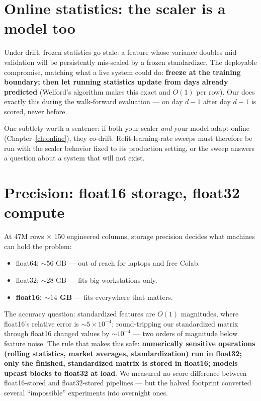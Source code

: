 \section{Online statistics: the scaler is a model too}

Under drift, frozen statistics go stale: a feature whose variance doubles
mid-validation will be persistently mis-scaled by a frozen standardizer.
The deployable compromise, matching what a live system could do:
\textbf{freeze at the training boundary; then let running statistics update
from days already predicted} (Welford's algorithm makes this exact and
$O(1)$ per row). Our  does exactly this during the
walk-forward evaluation ---  on day $d{-}1$ after day
$d{-}1$ is scored, never before.

One subtlety worth a sentence: if both your scaler \emph{and} your model
adapt online (Chapter~\ref{ch:online}), they co-drift. Refit-learning-rate
sweeps must therefore be run with the scaler behavior fixed to its
production setting, or the sweep answers a question about a system that
will not exist.

\section{Precision: float16 storage, float32 compute}

At 47M rows $\times$ 150 engineered columns, storage precision decides what
machines can hold the problem:

\begin{itemize}
\item float64: $\sim 56$ GB --- out of reach for laptops and free Colab.
\item float32: $\sim 28$ GB --- fits big workstations only.
\item \textbf{float16: $\sim 14$ GB} --- fits everywhere that matters.
\end{itemize}

The accuracy question: standardized features are $O(1)$ magnitudes, where
float16's relative error is $\sim 5 \times 10^{-4}$; round-tripping our
standardized matrix through float16 changed values by $\sim 10^{-4}$ ---
two orders of magnitude below feature noise. The rule that makes this safe:
\textbf{numerically sensitive operations (rolling statistics, market
averages, standardization) run in float32; only the finished, standardized
matrix is stored in float16; models upcast blocks to float32 at load}. We
measured no score difference between float16-stored and float32-stored
pipelines --- but the halved footprint converted several ``impossible''
experiments into overnight ones.

